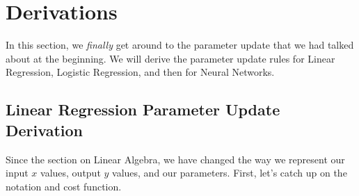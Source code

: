 \documentclass{article}
\begin{document}
\section{Derivations}
In this section, we \textit{finally} get around to the parameter update that we had talked about at the beginning. We will derive the parameter update rules for Linear Regression, Logistic Regression, and then for Neural Networks.

\subsection{Linear Regression Parameter Update Derivation}
Since the section on Linear Algebra, we have changed the way we represent our input $x$ values, output $y$ values, and our parameters. First, let's catch up on the notation and cost function.
\end{document}
